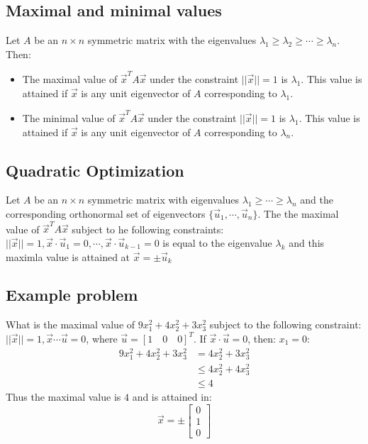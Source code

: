 \documentclass[11pt, a4paper]{article}
\begin{document}
\subsection{Maximal and minimal values}
Let $A$ be an $n \times n$ symmetric matrix with the eigenvalues $\lambda_1 \geq \lambda_2 \geq \cdots \geq \lambda_n$. Then:
\begin{itemize}
  \item The maximal value of $\vec{x}^T A \vec{x}$ under the constraint $||\vec{x}|| = 1$ is $\lambda_1$. This value is attained if $\vec{x}$ is any unit eigenvector of $A$ corresponding to $\lambda_1$.
  \item The minimal value of $\vec{x}^T A \vec{x}$ under the constraint $||\vec{x}|| = 1$ is $\lambda_1$. This value is attained if $\vec{x}$ is any unit eigenvector of $A$ corresponding to $\lambda_n$.
\end{itemize}


\subsection{Quadratic Optimization}
Let $A$ be an $n \times n$ symmetric matrix with eigenvalues $\lambda_1 \geq \cdots \geq \lambda_n$ and the corresponding orthonormal set of eigenvectors $\{\vec{u}_1, \cdots, \vec{u}_n \}$. The the maximal value of $\vec{x}^T A \vec{x}$ subject to he following constraints: $||\vec{x}|| = 1, \vec{x}\cdot \vec{u}_1 = 0, \cdots, \vec{x}\cdot \vec{u}_{k-1} = 0$ is equal to the eigenvalue $\lambda_k$ and this maximla value is attained at $\vec{x} = \pm\vec{u}_k$


\subsection{Example problem}
What is the maximal value of $9x_1^2 + 4x_2^2 + 3x_3^2$ subject to the following constraint: $||\vec{x}|| = 1, \vec{x}\cdots \vec{u} = 0$, where $\vec{u} = \left[1\quad 0\quad 0 \right]^T$. If $\vec{x}\cdot \vec{u}=0$, then: $x_1 = 0$:
\begin{align}
  9x_1^2 + 4x_2^2 + 3x_3^2 &= 4x_2^2 + 3x_3^2\\
  &\leq 4x_2^2 + 4x_3^2\\
  &\leq 4
\end{align}
Thus the maximal value is $4$ and is attained in:
\begin{equation*}
  \vec{x} = \pm
  \begin{bmatrix}
    0\\
    1\\
    0
  \end{bmatrix}
\end{equation*}
\end{document}
